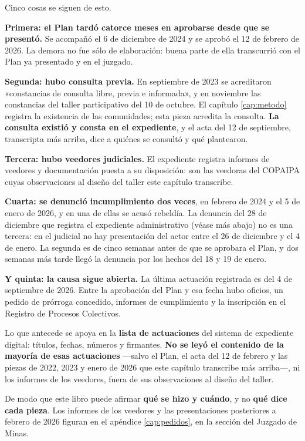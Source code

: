 Cinco cosas se siguen de esto.

\textbf{Primera: el Plan tardó catorce meses en aprobarse desde que se
presentó.} Se acompañó el 6 de diciembre de 2024 y se aprobó el 12 de febrero de 2026. La
demora no fue sólo de elaboración: buena parte de ella transcurrió con el
Plan ya presentado y en el juzgado.

\textbf{Segunda: hubo consulta previa.} En septiembre de 2023 se
acreditaron «constancias de consulta libre, previa e informada», y en noviembre las constancias del taller
participativo del 10 de octubre. El capítulo \ref{cap:metodo} registra la existencia de las comunidades; esta pieza acredita la consulta. \textbf{La consulta existió y consta en el
expediente}, y el acta del 12 de septiembre, transcripta más arriba, dice a quiénes se consultó y qué plantearon.

\textbf{Tercera: hubo veedores judiciales.} El expediente registra informes de veedores y
documentación puesta a su disposición: son las veedoras del COPAIPA cuyas observaciones al diseño del taller este capítulo transcribe.

\textbf{Cuarta: se denunció incumplimiento dos veces}, en febrero de 2024 y el 5 de enero de 2026,
y en una de ellas se acusó rebeldía. La denuncia del 28 de diciembre que registra el expediente administrativo (véase más abajo) no es una tercera: en el judicial no hay presentación del actor entre el 26 de diciembre y el 4 de enero. La segunda es de cinco semanas antes de que se aprobara el Plan, y dos semanas más tarde llegó la denuncia por los hechos del 18 y 19 de enero.

\textbf{Y quinta: la causa sigue abierta.} La última actuación registrada es del 4 de
septiembre de 2026. Entre la aprobación del Plan y esa fecha hubo oficios, un pedido de
prórroga concedido, informes de cumplimiento y la inscripción en el Registro de Procesos
Colectivos.

\begin{cautela}
Lo que antecede se apoya en la \textbf{lista de actuaciones} del sistema de expediente
digital: títulos, fechas, números y firmantes. \textbf{No se leyó el contenido de la mayoría de esas actuaciones} ---salvo el Plan, el acta del 12 de febrero y las piezas de 2022, 2023 y enero de 2026 que este capítulo transcribe más arriba---, ni los informes de los veedores, fuera de sus observaciones al diseño del taller.

De modo que este libro puede afirmar \textbf{qué se hizo y cuándo}, y no \textbf{qué dice cada
pieza}. Los informes de los veedores y las presentaciones posteriores a febrero de 2026 figuran en el apéndice \ref{cap:pedidos}, en la sección del Juzgado de Minas.
\end{cautela}

